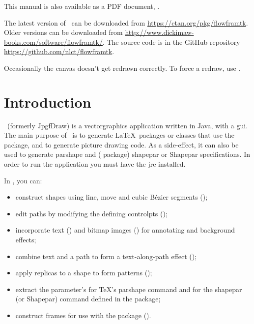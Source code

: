\IfTeXParserLib
  {%
    This manual is also available as a PDF document, . 
  }
  {}

The latest version of \FlowframTk\ can be downloaded from
\url{https://ctan.org/pkg/flowframtk}.
Older versions can be downloaded from
\url{http://www.dickimaw-books.com/software/flowframtk/}.
The source code is in the GitHub repository
\url{https://github.com/nlct/flowframtk}.

Occasionally the canvas doesn't get redrawn correctly. To force a
redraw, use .

\frontmatter
\tableofcontents

\mainmatter
\chapter{Introduction}
\label{sec:introduction}

\FlowframTk\ (formerly \gls{JpgfDraw})
is a \gls{vectorgraphics} application written in \gls{Java}, with a 
\gls{gui}.  The main purpose of \FlowframTk\ is to generate \LaTeX\ packages or 
classes that use the  package, and to generate
 picture drawing code. As a side-effect, it can also be
used to generate \gls{parshape} and ( package) \gls{shapepar} or 
\gls{Shapepar} specifications. In order to run the application you 
must have the \gls{jre} installed.

In \FlowframTk, you can:

\begin{itemize}
  \item construct shapes using line, move and cubic Bézier segments
();

  \item edit paths by modifying the defining \glspl{controlpt}
  ();

  \item incorporate text () and 
  bitmap images ()
  for annotating and background effects;

  \item combine text and a path to form a text-along-path
  effect ();

  \item apply replicas to a shape to form patterns
  ();

  \item extract the parameter's for \TeX's \gls{parshape} command and for 
  the \gls{shapepar} (or \gls{Shapepar}) command defined in the
   package;

  \item construct frames for use with the  package
  ().
\end{itemize}

